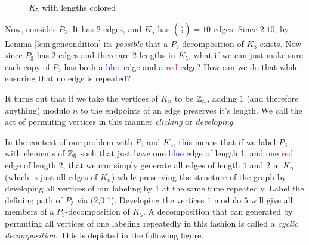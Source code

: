 \begin{figure}[H]
  \begin{center}
  \end{center}
  \caption{$K_{5}$ with lengths colored}
  \label{fig:K5colored}
\end{figure}
Now, consider $P_{3}$. It has $2$ edges, and $K_{5}$ has $\binom{5}{2}=10$ edges. Since $2|10$, by Lemma \ref{lem:gencondition} its \textit{possible} that a $P_{3}$-decomposition of $K_{5}$ exists. Now since $P_{3}$ has $2$ edges and there are $2$ lengths in $K_{5}$, what if we can just make sure each copy of $P_{3}$ has both a \textcolor{blue}{blue} edge and a \textcolor{red}{red} edge? How can we do that while ensuring that no edge is repeated?

It turns out that if we take the vertices of $K_{n}$ to be $\mathbb{Z}_{n}$, adding $1$ (and therefore anything) modulo $n$ to the endpoints of an edge preserves it's length. We call the act of permuting vertices in this manner \textit{clicking} or \textit{developing}.

In the context of our problem with $P_{3}$ and $K_{5}$, this means that if we label $P_{3}$ with elements of $\mathbb{Z}_{5}$ such that just have one \textcolor{blue}{blue} edge of length 1, and one \textcolor{red}{red} edge of length 2, that we can simply generate all edges of length $1$ and $2$ in $K_{n}$ (which is just all edges of $K_{n}$) while preserving the structure of the graph by developing all vertices of our labeling by $1$ at the same time repeatedly. Label the defining path of $P_{3}$ via (2,0,1). Developing the vertices $1$ modulo $5$ will give all members of a $P_{3}$-decomposition of $K_{5}$. A decomposition that can generated by permuting all vertices of one labeling repeatedly in this fashion is called a \textit{cyclic decomposition}. This is depicted in the following figure.

